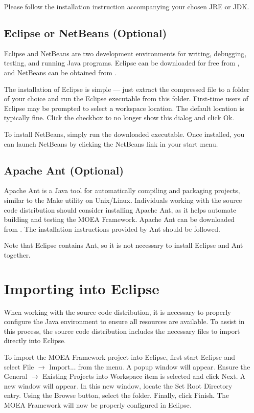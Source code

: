 Please follow the installation instruction accompanying your chosen JRE or JDK.

\subsection{Eclipse or NetBeans (Optional)}
Eclipse and NetBeans are two development environments for writing, debugging, testing, and running Java programs.  Eclipse can be downloaded for free from , and NetBeans can be obtained from .

The installation of Eclipse is simple --- just extract the compressed file to a folder of your choice and run the Eclipse executable from this folder.  First-time users of Eclipse may be prompted to select a workspace location.  The default location is typically fine.  Click the checkbox to no longer show this dialog and click Ok.

To install NetBeans, simply run the downloaded executable.  Once installed, you can launch NetBeans by clicking the NetBeans link in your start menu.

\subsection{Apache Ant (Optional)}
Apache Ant is a Java tool for automatically compiling and packaging projects, similar to the Make utility on Unix/Linux.  Individuals working with the source code distribution should consider installing Apache Ant, as it helps automate building and testing the MOEA Framework.  Apache Ant can be downloaded from .  The installation instructions provided by Ant should be followed.

Note that Eclipse contains Ant, so it is not necessary to install Eclipse and Ant together.

\section{Importing into Eclipse}
When working with the source code distribution, it is necessary to properly configure the Java environment to ensure all resources are available.  To assist in this process, the source code distribution includes the necessary files to import directly into Eclipse.

To import the MOEA Framework project into Eclipse, first start Eclipse and select File $\rightarrow$ Import... from the menu.  A popup window will appear.  Ensure the General $\rightarrow$ Existing Projects into Workspace item is selected and click Next.  A new window will appear.  In this new window, locate the Set Root Directory entry.  Using the Browse button, select the \folder{\moeaframework} folder.  Finally, click Finish.  The MOEA Framework will now be properly configured in Eclipse.

